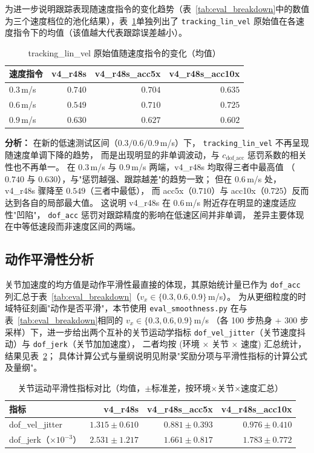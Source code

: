 \documentclass[12pt, a4paper]{article}
\begin{document}
为进一步说明跟踪表现随速度指令的变化趋势（表~\ref{tab:eval_breakdown}中的数值
为三个速度档位的池化结果），表~\ref{tab:tracking_by_speed}单独列出了
\texttt{tracking\_lin\_vel} 原始值在各速度指令下的均值（该值越大代表跟踪误差越小）。

\begin{table}[H]
\centering
\caption{tracking\_lin\_vel 原始值随速度指令的变化（均值）}
\label{tab:tracking_by_speed}
\begin{tabular}{lrrr}
\toprule
速度指令 & v4\_r48s & v4\_r48s\_acc5x & v4\_r48s\_acc10x \\
\midrule
$0.3$\,m/s & $0.740$ & $0.704$ & $0.635$ \\
$0.6$\,m/s & $0.549$ & $0.710$ & $0.725$ \\
$0.9$\,m/s & $0.630$ & $0.627$ & $0.602$ \\
\bottomrule
\end{tabular}
\end{table}

\textbf{分析：} 在新的低速测试区间（$0.3/0.6/0.9$\,m/s）下，
\texttt{tracking\_lin\_vel} 不再呈现随速度单调下降的趋势，
而是出现明显的非单调波动，与 $c_\text{dof\_acc}$ 惩罚系数的相关性也不再单一。
在 $0.3$\,m/s 与 $0.9$\,m/s 两端，v4\_r48s 均取得三者中最高值
（$0.740$ 与 $0.630$），与"惩罚越强、跟踪越差"的趋势一致；
但在 $0.6$\,m/s 处，v4\_r48s 骤降至 $0.549$（三者中最低），
而 acc5x（$0.710$）与 acc10x（$0.725$）反而达到各自的局部最大值。
这说明 v4\_r48s 在 $0.6$\,m/s 附近存在明显的速度适应性"凹陷"，
\texttt{dof\_acc} 惩罚对跟踪精度的影响在低速区间并非单调，
差异主要体现在中等低速段而非速度区间的两端。

\subsection{动作平滑性分析}

关节加速度的均方值是动作平滑性最直接的体现，其原始统计量已作为
\texttt{dof\_acc} 列汇总于表~\ref{tab:eval_breakdown}（$v_x \in \{0.3, 0.6, 0.9\}$\,m/s）。
为从更细粒度的时域特征刻画"动作是否平滑"，本节使用 \texttt{eval\_smoothness.py}
在与表~\ref{tab:eval_breakdown}相同的 $v_x \in \{0.3, 0.6, 0.9\}$\,m/s
（各 100 步热身 + 300 步采样）下，进一步给出两个互补的关节运动学指标
\texttt{dof\_vel\_jitter}（关节速度抖动）与 \texttt{dof\_jerk}（关节加加速度），
二者均按 (环境 × 关节 × 速度) 汇总统计，结果见表~\ref{tab:joint_smoothness}；
具体计算公式与量纲说明见附录"奖励分项与平滑性指标的计算公式及量纲"。

\begin{table}[H]
\centering
\caption{关节运动平滑性指标对比（均值，$\pm$标准差，按环境×关节×速度汇总）}
\label{tab:joint_smoothness}
\begin{tabular}{lrrr}
\toprule
指标 & v4\_r48s & v4\_r48s\_acc5x & v4\_r48s\_acc10x \\
\midrule
dof\_vel\_jitter & $1.315\pm0.610$ & $0.881\pm0.393$ & $0.976\pm0.410$ \\
dof\_jerk（×$10^{-3}$） & $2.531\pm1.217$ & $1.661\pm0.817$ & $1.783\pm0.772$ \\
\bottomrule
\end{tabular}
\end{table}
\end{document}
